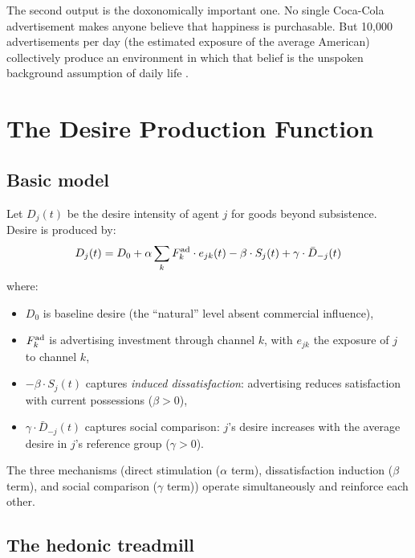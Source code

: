 The second output is the doxonomically important one.
No single Coca-Cola advertisement makes anyone believe that happiness is purchasable.
But 10,000 advertisements per day (the estimated exposure of the average American) collectively produce an environment in which that belief is the unspoken background assumption of daily life \autocite{adorno1944, debord1967}.

\section{The Desire Production Function}
\label{sec:ch23-desire}

\subsection{Basic model}

\begin{model}
\label{mod:desire}
Let $D_j(t)$ be the desire intensity of agent $j$ for goods beyond subsistence.
Desire is produced by:
\[
  D_j(t) = D_0 + \alpha \sum_k F_{k}^{\text{ad}} \cdot e_{jk}(t) - \beta \cdot S_j(t) + \gamma \cdot \bar{D}_{-j}(t)
\]
where:
\begin{itemize}[nosep]
  \item $D_0$ is baseline desire (the ``natural'' level absent commercial influence),
  \item $F_{k}^{\text{ad}}$ is advertising investment through channel $k$, with $e_{jk}$ the exposure of $j$ to channel $k$,
  \item $-\beta \cdot S_j(t)$ captures \emph{induced dissatisfaction}: advertising reduces satisfaction with current possessions ($\beta > 0$),
  \item $\gamma \cdot \bar{D}_{-j}(t)$ captures social comparison: $j$'s desire increases with the average desire in $j$'s reference group ($\gamma > 0$).
\end{itemize}
\end{model}

The three mechanisms (direct stimulation ($\alpha$ term), dissatisfaction induction ($\beta$ term), and social comparison ($\gamma$ term)) operate simultaneously and reinforce each other.

\subsection{The hedonic treadmill}

